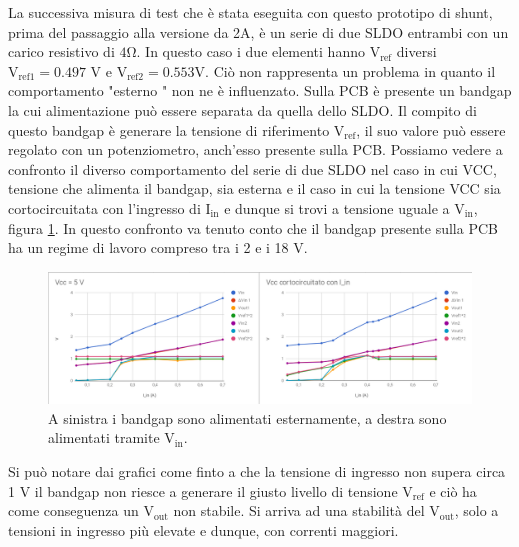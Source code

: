 La successiva misura di test che è stata eseguita con questo prototipo di shunt, prima del passaggio alla versione da 2A, è un serie di due SLDO entrambi con un carico resistivo di $\mathrm{4 \Omega}$. In questo caso i due elementi hanno $\mathrm{V_{ref}}$ diversi $\mathrm{V_{ref1}=0.497}$ V e $\mathrm{V_{ref2}=0.553 V}$. 
Ciò non rappresenta un problema in quanto il comportamento "esterno " non ne è influenzato.
Sulla PCB è presente un bandgap la cui alimentazione può essere separata da quella dello SLDO. Il compito di questo bandgap è generare la tensione di riferimento $\mathrm{V_{ref}}$, il suo valore può essere regolato con un potenziometro, anch'esso presente sulla PCB.
Possiamo vedere a confronto il diverso comportamento del serie di due SLDO nel caso in cui VCC, tensione che alimenta il bandgap, sia esterna e il caso in cui la tensione VCC sia cortocircuitata con l'ingresso di $\mathrm{I_{in}}$ e dunque si trovi a tensione uguale a $\mathrm{V_{in}}$, figura \ref{SLDO5Serie}. In questo confronto va tenuto conto che il bandgap presente sulla PCB ha un regime di lavoro compreso tra  i 2 e i 18 V. 
\begin{figure}
\centering
\includegraphics[scale=.3]{Immagini/SLDO5Serie}
\caption{A sinistra i bandgap sono alimentati esternamente, a destra sono alimentati tramite $\mathrm{V_{in}}$.}
\label{SLDO5Serie}
\end{figure}
Si può notare dai grafici come finto a che la tensione di ingresso non supera circa 1 V il bandgap non riesce a generare il giusto livello di tensione $\mathrm{V_{ref}}$ e ciò ha come conseguenza un $\mathrm{V_{out}}$ non stabile. Si arriva ad una stabilità del $\mathrm{V_{out}}$, solo a tensioni in ingresso più elevate e dunque, con correnti maggiori.

